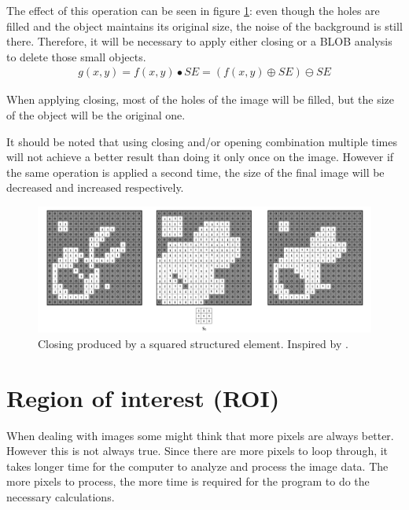 The effect of this operation can be seen in figure \ref{fig:Closing}: even though the holes are filled and the object maintains its original size, the noise of the background is still there. Therefore, it will be necessary to apply either closing or a BLOB analysis to delete those small objects.
\begin{equation}
\begin{aligned}
{g(x,y)}={f(x,y)}\bullet{SE}=({f(x,y)}\oplus{SE})\ominus{SE}
\label{Closing}
	\end{aligned}
\end{equation}

When applying closing, most of the holes of the image will be filled, but the size of the object will be the original one. 

It should be noted that using closing and/or opening combination multiple times will not achieve a better result than doing it only once on the image. However if the same operation is applied a second time, the size of the final image will be decreased and increased respectively.

\begin{figure}[htbp]
\centering
\includegraphics[width=1\textwidth]{Pictures/Theory/ClosingSq.png}
\caption{Closing produced by a squared structured element. Inspired by \citep{ip_book}.}
\label{fig:Closing}
\end{figure}

\section{Region of interest (ROI)}\label{roi}
When dealing with images some might think that more pixels are always better. However this is not always true. Since there are more pixels to loop through, it takes longer time for the computer to analyze and process the image data. The more pixels to process, the more time is required for the program to do the necessary calculations.

